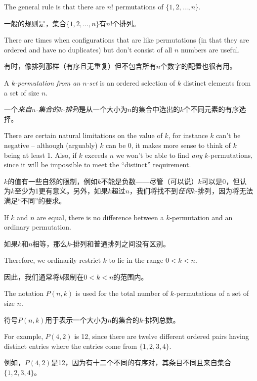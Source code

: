 The general rule is that there are $n!$ permutations of $\{1, 2, \ldots , n\}$.

一般的规则是，集合$\{1, 2, \ldots , n\}$有$n!$个排列。

There are times when configurations that are like permutations (in that they
are ordered and have no duplicates) but don't consist of all $n$ numbers 
are useful.

有时，像排列那样（有序且无重复）但不包含所有$n$个数字的配置也很有用。

\begin{defi}
A \emph{$k$-permutation from an $n$-set} is an ordered selection
of $k$ distinct elements from a set of size $n$.
\end{defi}

\begin{defi}
一个\emph{来自$n$-集合的$k$-排列}是从一个大小为$n$的集合中选出的$k$个不同元素的有序选择。
\end{defi}

There are certain natural limitations on the value of $k$, for instance $k$
can't be negative -- although (arguably) $k$ can be 0, it makes more sense
to think of $k$ being at least 1.  Also, if $k$ exceeds
$n$ we won't be able to find \emph{any} $k$-permutations, 
since it will be impossible
to meet the ``distinct'' requirement.

$k$的值有一些自然的限制，例如$k$不能是负数——尽管（可以说）$k$可以是0，但认为$k$至少为1更有意义。另外，如果$k$超过$n$，我们将找不到\emph{任何}$k$-排列，因为将无法满足“不同”的要求。

If $k$ and $n$ are equal, there is 
no difference between a $k$-permutation and an ordinary permutation.

如果$k$和$n$相等，那么$k$-排列和普通排列之间没有区别。

Therefore, we ordinarily restrict $k$ to lie in the range $0 < k < n$.

因此，我们通常将$k$限制在$0 < k < n$的范围内。

The notation $P(n,k)$ is used for the total number of $k$-permutations
of a set of size $n$.

符号$P(n,k)$用于表示一个大小为$n$的集合的$k$-排列总数。

For example, $P(4,2)$ is 12, since there are
twelve different ordered pairs having distinct entries where the 
entries come from $\{1,2,3,4\}$.

例如，$P(4,2)$是12，因为有十二个不同的有序对，其条目不同且来自集合$\{1,2,3,4\}$。

